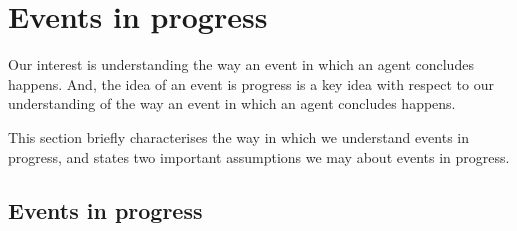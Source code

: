 \section{Events in progress}
\label{sec:events-progress}


\begin{note}
  Our interest is understanding the way an event in which an agent concludes happens.
  And, the idea of an event is progress is a key idea with respect to our understanding of the way an event in which an agent concludes happens.

  This section briefly characterises the way in which we understand events in progress, and states two important assumptions we may about events in progress.
\end{note}



\subsection{Events in progress}


